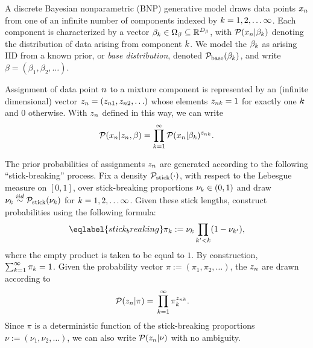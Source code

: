 A discrete Bayesian nonparametric (BNP) generative model draws data points
$x_n$ from one of an infinite number of components indexed by $k = 1, 2,
\ldots \infty$. Each component is characterized by a vector $\beta_k \in
\Omega_{\beta} \subseteq \mathbb{R}^{{D_{\beta}}}$, with $\mathcal{P}(x_n \vert \beta_k)$
denoting the distribution of data arising from  component $k$. We model the
$\beta_k$ as arising IID from a known prior, or \textit{base distribution},
denoted $\mathcal{P}_{\mathrm{base}}(\beta_k)$, and write $\beta = (\beta_1, \beta_2, \ldots)$.

Assignment of data point $n$ to a mixture component is represented by an
(infinite dimensional) vector $z_n = (z_{n1}, z_{n2}, \ldots)$ whose
elements $z_{nk} = 1$ for exactly one $k$ and $0$ otherwise. With $z_n$
defined in this way, we can write
%
\begin{align*}
%
\p(\x_n \vert \z_\n, \beta) =
    \prod_{k=1}^\infty \p(\x_n \vert \beta_\k)^{\z_{\n\k}}.
%
\end{align*}

The prior probabilities of assignments $z_{n}$ are generated according to the
following ``stick-breaking'' process. Fix a density $\mathcal{P}_{\mathrm{stick}}(\cdot)$, with
respect to the Lebesgue measure on $[0,1]$, over stick-breaking proportions
$\nu_{k} \in (0, 1)$ and draw $\nu_{k}\overset{iid}{\sim}\mathcal{P}_{\mathrm{stick}}(\nu_{k})$ for $k=1,2,\ldots\infty$.
Given these stick lengths, construct probabilities using the following formula:
%
\begin{align}\eqlabel{stick_breaking}
%
\pi_\k := \nuk \prod_{\k' < \k} (1 - \nu_{\k'}),
%
\end{align}
%
where the empty product is taken to be equal to $1$. By construction,
$\sum_{k=1}^{\infty} \pi_k = 1$. Given the probability vector $\pi := (\pi_1,
\pi_2, \ldots)$, the $z_n$ are drawn according to
%
\begin{align*}
%
\p(\z_\n \vert \pi) ={}&
   \prod_{k=1}^{\infty} \pi_\k^{\z_{\n\k}}.
%
\end{align*}
%
Since $\pi$ is a deterministic function of the stick-breaking proportions $\nu :=
(\nu_1, \nu_2, \ldots)$, we can also write $\mathcal{P}(z_n \vert \nu)$ with no
ambiguity.


